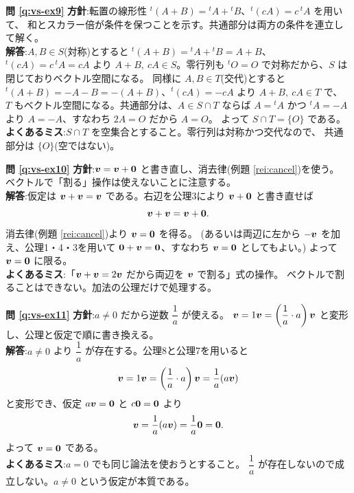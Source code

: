 \bigskip
\noindent\textbf{問 \ref{q:vs-ex9}}\quad
\textbf{方針}:転置の線形性 ${}^t(A + B) = {}^t\!A + {}^t\!B$、${}^t(cA) = c\,{}^t\!A$ を用いて、
和とスカラー倍が条件を保つことを示す。共通部分は両方の条件を連立して解く。\\
\textbf{解答}:$A, B \in S$(対称)とすると
${}^t(A + B) = {}^t\!A + {}^t\!B = A + B$、${}^t(cA) = c\,{}^t\!A = cA$ より
$A + B,\ cA \in S$。零行列も ${}^tO = O$ で対称だから、$S$ は閉じておりベクトル空間になる。
同様に $A, B \in T$(交代)とすると
${}^t(A + B) = -A - B = -(A + B)$、${}^t(cA) = -cA$ より $A + B,\ cA \in T$ で、
$T$ もベクトル空間になる。共通部分は、$A \in S \cap T$ ならば
$A = {}^t\!A$ かつ ${}^t\!A = -A$ より $A = -A$、すなわち $2A = O$ だから $A = O$。
よって $S \cap T = \{O\}$ である。\\
\textbf{よくあるミス}:$S \cap T$ を空集合とすること。零行列は対称かつ交代なので、
共通部分は $\{O\}$(空ではない)。

\bigskip
\noindent\textbf{問 \ref{q:vs-ex10}}\quad
\textbf{方針}:$\bm{v} = \bm{v} + \bm{0}$ と書き直し、消去律(例題 \ref{rei:cancel})を使う。
ベクトルで「割る」操作は使えないことに注意する。\\
\textbf{解答}:仮定は $\bm{v} + \bm{v} = \bm{v}$ である。右辺を公理3により
$\bm{v} + \bm{0}$ と書き直せば
\[
\bm{v} + \bm{v} = \bm{v} + \bm{0}.
\]
消去律(例題 \ref{rei:cancel})より $\bm{v} = \bm{0}$ を得る。
(あるいは両辺に左から $-\bm{v}$ を加え、公理1・4・3を用いて
$\bm{0} + \bm{v} = \bm{0}$、すなわち $\bm{v} = \bm{0}$ としてもよい。)
よって $\bm{v} = \bm{0}$ に限る。\\
\textbf{よくあるミス}:「$\bm{v} + \bm{v} = 2\bm{v}$ だから両辺を $\bm{v}$ で割る」式の操作。
ベクトルで割ることはできない。加法の公理だけで処理する。

\bigskip
\noindent\textbf{問 \ref{q:vs-ex11}}\quad
\textbf{方針}:$a \ne 0$ だから逆数 $\dfrac{1}{a}$ が使える。
$\bm{v} = 1\bm{v} = \left(\dfrac{1}{a}\cdot a\right)\bm{v}$ と変形し、公理と仮定で順に書き換える。\\
\textbf{解答}:$a \ne 0$ より $\dfrac{1}{a}$ が存在する。公理8と公理7を用いると
\[
\bm{v} = 1\bm{v} = \left(\frac{1}{a}\cdot a\right)\bm{v} = \frac{1}{a}(a\bm{v})
\]
と変形でき、仮定 $a\bm{v} = \bm{0}$ と $c\bm{0} = \bm{0}$ より
\[
\bm{v} = \frac{1}{a}(a\bm{v}) = \frac{1}{a}\bm{0} = \bm{0}.
\]
よって $\bm{v} = \bm{0}$ である。\\
\textbf{よくあるミス}:$a = 0$ でも同じ論法を使おうとすること。
$\dfrac{1}{a}$ が存在しないので成立しない。$a \ne 0$ という仮定が本質である。

